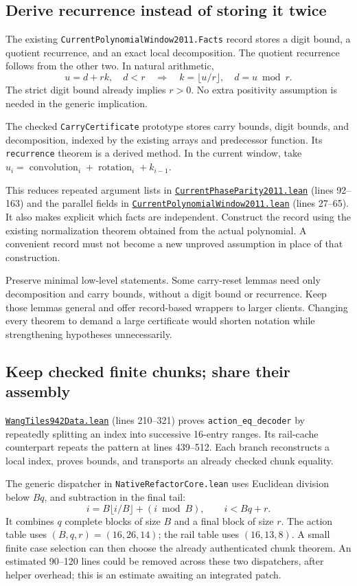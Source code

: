 \documentclass[11pt,letterpaper]{article}
\newcommand{\code}[1]{\nolinkurl{#1}}
\newcommand{\src}[2]{\href{https://github.com/VladimirReshetnikov/ProveIt/blob/60e9c5d620c6c387d932876cfa2d9376f64ea56c/Computability/DiophantineConsistency/Lean/DiophantineConsistency/#1.lean}{\nolinkurl{#1.lean}} (lines #2)}
\begin{document}
\subsection{Derive recurrence instead of storing it twice}

The existing \code{CurrentPolynomialWindow2011.Facts} record stores a
digit bound, a quotient recurrence, and an exact local decomposition.
The quotient recurrence follows from the other two. In natural arithmetic,
\[
u=d+rk,\quad d<r
\quad\Longrightarrow\quad
k=\lfloor u/r\rfloor,\quad d=u\bmod r.
\]
The strict digit bound already implies \(r>0\). No extra positivity
assumption is needed in the generic implication.

The checked \code{CarryCertificate} prototype stores carry bounds,
digit bounds, and decomposition, indexed by the existing arrays and
predecessor function. Its \code{recurrence} theorem is a derived method.
In the current window, take
\(u_i=\operatorname{convolution}_i+
\operatorname{rotation}_i+k_{i-1}\).

This reduces repeated argument lists in
\src{CurrentPhaseParity2011}{92--163} and the parallel fields in
\src{CurrentPolynomialWindow2011}{27--65}. It also makes explicit which
facts are independent. Construct the record using the existing
normalization theorem obtained from the actual polynomial. A convenient
record must not become a new unproved assumption in place of that
construction.

Preserve minimal low-level statements. Some carry-reset lemmas need only
decomposition and carry bounds, without a digit bound or recurrence.
Keep those lemmas general and offer record-based wrappers to larger
clients. Changing every theorem to demand a large certificate would
shorten notation while strengthening hypotheses unnecessarily.

\subsection{Keep checked finite chunks; share their assembly}

\src{WangTiles942Data}{210--321} proves
\code{action_eq_decoder} by repeatedly splitting an index into successive
16-entry ranges. Its rail-cache counterpart repeats the pattern at
lines 439--512. Each branch reconstructs a local index, proves bounds,
and transports an already checked chunk equality.

The generic dispatcher in \code{NativeRefactorCore.lean} uses Euclidean
division below \(Bq\), and subtraction in the final tail:
\[
i=B\lfloor i/B\rfloor+(i\bmod B),\qquad
i<Bq+r.
\]
It combines \(q\) complete blocks of size \(B\) and a final block of
size \(r\). The action table uses \((B,q,r)=(16,26,14)\); the rail
table uses \((16,13,8)\). A small finite case selection can then choose
the already authenticated chunk theorem. An estimated 90--120 lines
could be removed across these two dispatchers, after helper overhead;
this is an estimate awaiting an integrated patch.
\end{document}
